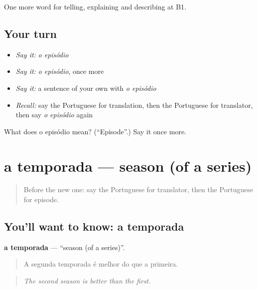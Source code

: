 \begin{grammarlens}[title={What you've built}]
One more word for telling, explaining and describing at B1.
\end{grammarlens}

\subsection*{Your turn}
\begin{itemize}
\raggedright
  \item \emph{Say it:} \emph{o episódio}
  \item \emph{Say it:} \emph{o episódio}, once more
  \item \emph{Say it:} a sentence of your own with \emph{o episódio}
  \item \emph{Recall:} say the Portuguese for translation, then the Portuguese for translator, then say \emph{o episódio} again
\end{itemize}

\begin{tcolorbox}[breakable,colback=teal!4,colframe=teal!35!black,title={Before you move on}]
What does o episódio mean? (\textquotedblleft{}Episode\textquotedblright{}.) Say it once more.
\end{tcolorbox}
\section[a temporada]{a temporada — season (of a series)}

\label{lesson:PT-C526-temporada}



\begin{quote}
Before the new one: say the Portuguese for translator, then the Portuguese for episode.
\end{quote}

\subsection*{You'll want to know: a temporada}
\textbf{a temporada} — \textquotedblleft{}season (of a series)\textquotedblright{}.

\begin{quote}
A segunda temporada é melhor do que a primeira.
\end{quote}

\begin{quote}
\emph{The second season is better than the first.}
\end{quote}

